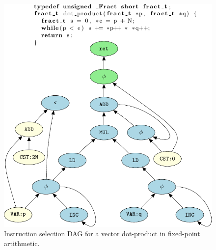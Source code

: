 \begin{figure}[ht]
\begin{center}


    \includegraphics{pgf-fig003}
  \end{center}
  \caption{Instruction selection DAG for a vector dot-product in
    fixed-point artithmetic.}\label{fig:ssa_graph}
\end{figure}

